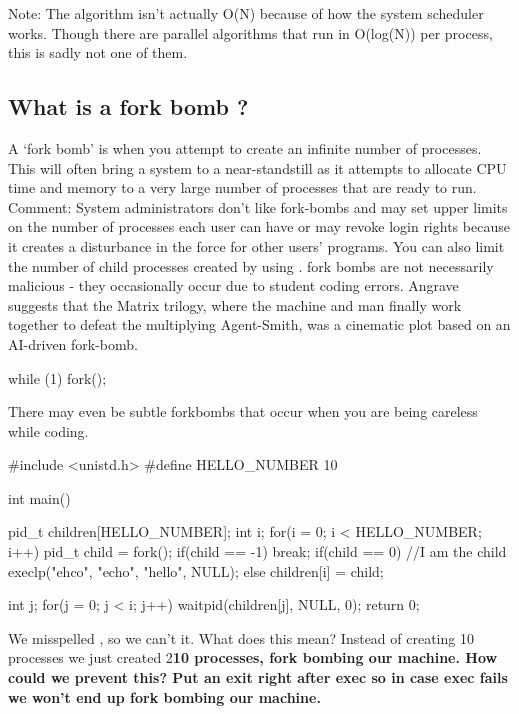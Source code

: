 Note: The algorithm isn't actually O(N) because of how the system scheduler works. Though there are parallel algorithms that run in O(log(N)) per process, this is sadly not one of them.

\subsection{What is a fork bomb ?}\label{what-is-a-fork-bomb}

A `fork bomb' is when you attempt to create an infinite number of processes. This will often bring a system to a near-standstill as it attempts to allocate CPU time and memory to a very large number of processes that are ready to run. Comment: System administrators don't like fork-bombs and may set upper limits on the number of processes each user can have or may revoke login rights because it creates a disturbance in the force for other users' programs. You can also limit the number of child processes created by using . fork bombs are not necessarily malicious - they occasionally occur due to student coding errors. Angrave suggests that the Matrix trilogy, where the machine and man finally work together to defeat the multiplying Agent-Smith, was a cinematic plot based on an AI-driven fork-bomb.

\begin{code}[language=C]
while (1) fork();
\end{code}

There may even be subtle forkbombs that occur when you are being careless while coding.

\begin{code}[language=C]
#include <unistd.h>
#define HELLO_NUMBER 10

int main(){
    pid_t children[HELLO_NUMBER];
    int i;
    for(i = 0; i < HELLO_NUMBER; i++){
        pid_t child = fork();
        if(child == -1){
            break;
        }
        if(child == 0){ //I am the child
             execlp("ehco", "echo", "hello", NULL);
        }
        else{
            children[i] = child;
        }
    }

    int j;
    for(j = 0; j < i; j++){
        waitpid(children[j], NULL, 0);
    }
    return 0;
}
\end{code}

We misspelled , so we can't  it. What does this mean? Instead of creating 10 processes we just created 2\textbf{10 processes, fork bombing our machine. How could we prevent this? Put an exit right after exec so in case exec fails we won't end up fork bombing our machine.}

